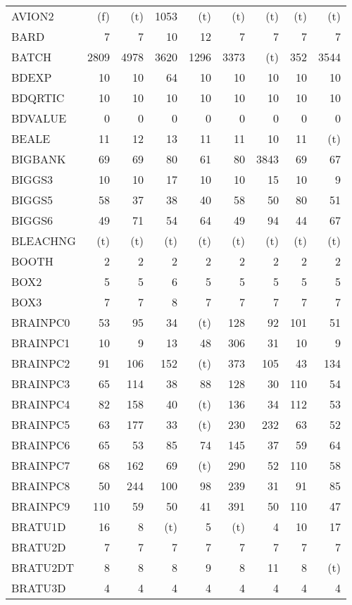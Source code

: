 \documentclass[11pt,twoside]{article}
\begin{document}
{\begin{longtable}[c]{|l|r|r|r|r|r|r|r|r|}
 AVION2 & (f) & (t) & 1053 & (t) & (t) & (t) & (t) & (t) \\
 BARD & 7 & 7 & 10 & 12 & 7 & 7 & 7 & 7 \\
 BATCH & 2809 & 4978 & 3620 & 1296 & 3373 & (t) & 352 & 3544 \\
 BDEXP & 10 & 10 & 64 & 10 & 10 & 10 & 10 & 10 \\
 BDQRTIC & 10 & 10 & 10 & 10 & 10 & 10 & 10 & 10 \\
 BDVALUE & 0 & 0 & 0 & 0 & 0 & 0 & 0 & 0 \\
 BEALE & 11 & 12 & 13 & 11 & 11 & 10 & 11 & (t) \\
 BIGBANK & 69 & 69 & 80 & 61 & 80 & 3843 & 69 & 67 \\
 BIGGS3 & 10 & 10 & 17 & 10 & 10 & 15 & 10 & 9 \\
 BIGGS5 & 58 & 37 & 38 & 40 & 58 & 50 & 80 & 51 \\
 BIGGS6 & 49 & 71 & 54 & 64 & 49 & 94 & 44 & 67 \\
 BLEACHNG & (t) & (t) & (t) & (t) & (t) & (t) & (t) & (t) \\
 BOOTH & 2 & 2 & 2 & 2 & 2 & 2 & 2 & 2 \\
 BOX2 & 5 & 5 & 6 & 5 & 5 & 5 & 5 & 5 \\
 BOX3 & 7 & 7 & 8 & 7 & 7 & 7 & 7 & 7 \\
 BRAINPC0 & 53 & 95 & 34 & (t) & 128 & 92 & 101 & 51 \\
 BRAINPC1 & 10 & 9 & 13 & 48 & 306 & 31 & 10 & 9 \\
 BRAINPC2 & 91 & 106 & 152 & (t) & 373 & 105 & 43 & 134 \\
 BRAINPC3 & 65 & 114 & 38 & 88 & 128 & 30 & 110 & 54 \\
 BRAINPC4 & 82 & 158 & 40 & (t) & 136 & 34 & 112 & 53 \\
 BRAINPC5 & 63 & 177 & 33 & (t) & 230 & 232 & 63 & 52 \\
 BRAINPC6 & 65 & 53 & 85 & 74 & 145 & 37 & 59 & 64 \\
 BRAINPC7 & 68 & 162 & 69 & (t) & 290 & 52 & 110 & 58 \\
 BRAINPC8 & 50 & 244 & 100 & 98 & 239 & 31 & 91 & 85 \\
 BRAINPC9 & 110 & 59 & 50 & 41 & 391 & 50 & 110 & 47 \\
 BRATU1D & 16 & 8 & (t) & 5 & (t) & 4 & 10 & 17 \\
 BRATU2D & 7 & 7 & 7 & 7 & 7 & 7 & 7 & 7 \\
 BRATU2DT & 8 & 8 & 8 & 9 & 8 & 11 & 8 & (t) \\
 BRATU3D & 4 & 4 & 4 & 4 & 4 & 4 & 4 & 4 \\

\end{longtable}}
\end{document}
